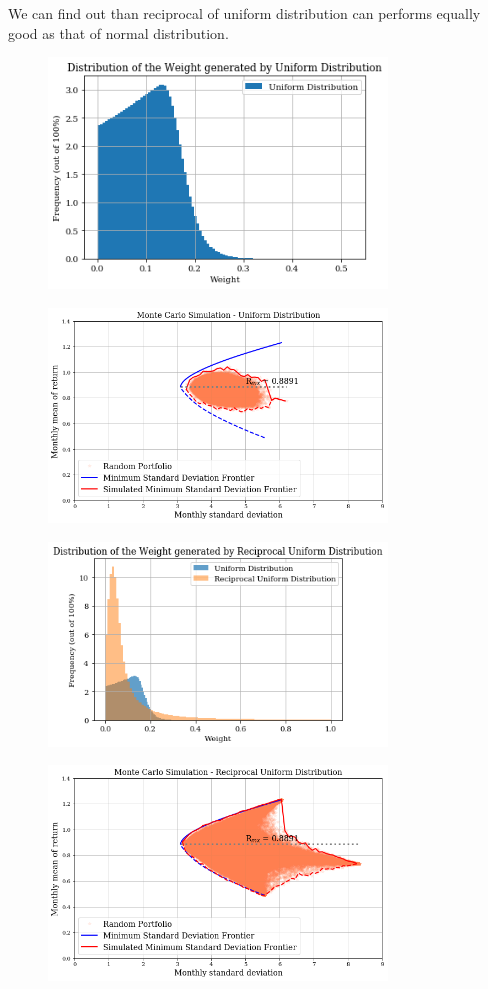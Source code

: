 \documentclass{article}
\begin{document}
We can find out than reciprocal of uniform distribution can performs equally good as that of normal distribution.
\begin{figure}[h]
	\centering
	\includegraphics[width=9cm]{output_45_0.png}
\end{figure}
\begin{figure}[h]
	\centering
	\includegraphics[width=9cm]{output_45_1.png}
\end{figure}
\begin{figure}[h]
	\centering
	\includegraphics[width=9cm]{output_46_0.png}
\end{figure}
\begin{figure}[h]
	\centering
	\includegraphics[width=9cm]{output_46_1.png}
\end{figure}
\end{document}
